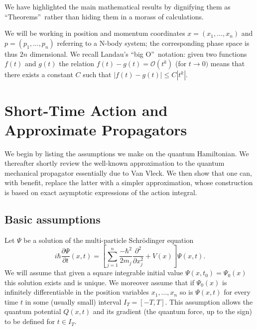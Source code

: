 \documentclass[12pt]{article}%
\begin{document}
We have highlighted the main mathematical results by dignifying them as
\textquotedblleft Theorems\textquotedblright\ rather than hiding them in a
morass of calculations.

We will be working in position and momentum coordinates $x=(x_{1},...,x_{n})$
and $p=(p_{1},...,p_{n})$ referring to a N-body system; the corresponding
phase space is thus $2n$ dimensional. We recall Landau's \textquotedblleft big
O\textquotedblright\ notation: given two functions $f(t)$ and $g(t)$ the
relation $f(t)-g(t)=\mathcal{O}(t^{k})$ (for $t\rightarrow0)$ means that there
exists a constant $C$ such that $|f(t)-g(t)|\leq C|t^{k}|$.

\section{Short-Time Action and Approximate Propagators\label{sec1}}

We begin by listing the assumptions we make on the quantum Hamiltonian. We
thereafter shortly review the well-known approximation to the quantum
mechanical propagator essentially due to Van Vleck. We then show that one can,
with benefit, replace the latter with a simpler approximation, whose
construction is based on exact asymptotic expressions of the action integral.

\subsection{Basic assumptions\label{sec11}}

Let $\Psi$ be a solution of the multi-particle Schr\"{o}dinger equation%
\begin{equation}
i\hbar\frac{\partial\Psi}{\partial t}(x,t)=\left[  \sum_{j=1}^{n}\frac
{-\hbar^{2}}{2m_{j}}\frac{\partial^{2}}{\partial x_{j}^{2}}+V(x)\right]
\Psi(x,t). \label{schrodeq}%
\end{equation}
We will assume that given a square integrable initial value $\Psi
(x,t_{0})=\Psi_{0}(x)$ this solution exists and is unique. We moreover assume
that if $\Psi_{0}(x)$ is infinitely differentiable in the position variables
$x_{1},...,x_{n}$ so is $\Psi(x,t)$ for every time $t$ in some (usually small)
interval $I_{T}=[-T,T]$. This assumption allows the quantum potential $Q(x,t)$
and its gradient (the quantum force, up to the sign) to be defined for $t\in
I_{T}$.
\end{document}
